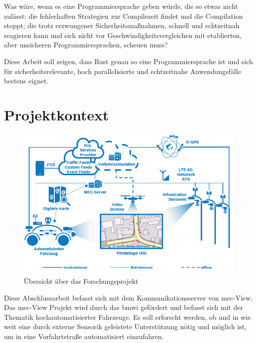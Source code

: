 Was wäre, wenn es eine Programmiersprache geben würde, die so etwas nicht zulässt: die fehlerhaften Strategien zur Compilezeit findet und die Compilation stoppt; die trotz erzwungener Sicherheitsmaßnahmen, schnell und echtzeitnah reagieren kann und sich nicht vor Geschwindigkeitsvergleichen mit etablierten, aber unsicheren Programmiersprachen, scheuen muss?

Diese Arbeit soll zeigen, dass Rust genau so eine Programmiersprache ist und sich für sicherheitsrelevante, hoch parallelisierte und echtzeitnahe Anwendungsfälle bestens eignet.



\clearpage %
\section{Projektkontext}
\begin{figure}[H]
	\label{test 123}
	\centering
	\includegraphics[width=\textwidth]{images/MECView_Arch_de_V1_mod.png}
	\caption[Übersicht über das Forschungsprojekt]{Übersicht über das Forschungsprojekt\protect\footnotemark}
\end{figure}

Diese Abschlussarbeit befasst sich mit dem Kommunikationsserver von \gls{mec}-View.
Das \gls{mec}-View Projekt wird durch das \gls{bmwi} gefördert und befasst sich mit der Thematik hochautomatisierter Fahrzeuge.
Es soll erforscht werden, ob und in wie weit eine durch externe Sensorik geleistete Unterstützung nötig und möglich ist, um in eine Vorfahrtstraße automatisiert einzufahren.

